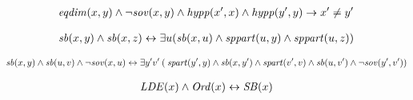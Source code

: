 \begin{erin}[A30.]
    \begin{align*}
        \mathit{eqdim}(x,y) \wedge \neg\mathit{sov}(x,y) \wedge \mathit{hypp}(x',x) \wedge \mathit{hypp}(y',y) \to x' \neq y'
    \end{align*}
\end{erin}
                
\begin{erin}
    \begin{align*}
        \mathit{sb}(x,y) \wedge \mathit{sb}(x,z) \leftrightarrow \exists u (\mathit{sb}(x,u) \land \mathit{sppart}(u,y) \land \mathit{sppart}(u,z))
    \end{align*}
\end{erin}

\begin{erin}[A32'.]
    \begin{align*}
        \mathit{sb}(x,y) \land \mathit{sb}(u,v) \land \neg \mathit{sov}(x,u) \leftrightarrow \exists y'v'\:(\: \mathit{spart}(y',y) \land \mathit{sb}(x,y') \land \mathit{spart}(v',v) \land \mathit{sb}(u,v') \land \neg \mathit{sov}(y',v'))
    \end{align*}
\end{erin}

\begin{erin}
    \begin{align*}
        \mathit{LDE}(x) \land \mathit{Ord}(x) \leftrightarrow \mathit{S\hspace*{-0.25ex}B}(x)
    \end{align*}
\end{erin}






